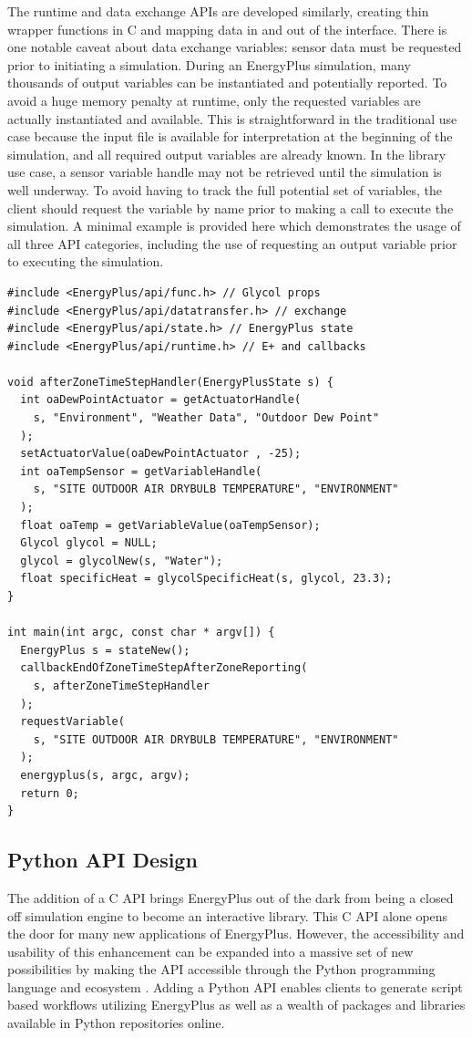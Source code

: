 \documentclass[5p, authoryear]{elsarticle}
\begin{document}
The runtime and data exchange APIs are developed similarly, creating thin wrapper functions in C and mapping data in and out of the interface.  There is one notable caveat about data exchange variables: sensor data must be requested prior to initiating a simulation.  During an EnergyPlus simulation, many thousands of output variables can be instantiated and potentially reported.  To avoid a huge memory penalty at runtime, only the requested variables are actually instantiated and available.  This is straightforward in the traditional use case because the input file is available for interpretation at the beginning of the simulation, and all required output variables are already known.  In the library use case, a sensor variable handle may not be retrieved until the simulation is well underway.  To avoid having to track the full potential set of variables, the client should request the variable by name prior to making a call to execute the simulation.  A minimal example is provided here which demonstrates the usage of all three API categories, including the use of requesting an output variable prior to executing the simulation.  

\lstset{language=c}
\begin{lstlisting}
#include <EnergyPlus/api/func.h> // Glycol props
#include <EnergyPlus/api/datatransfer.h> // exchange 
#include <EnergyPlus/api/state.h> // EnergyPlus state
#include <EnergyPlus/api/runtime.h> // E+ and callbacks

void afterZoneTimeStepHandler(EnergyPlusState s) {
  int oaDewPointActuator = getActuatorHandle(
    s, "Environment", "Weather Data", "Outdoor Dew Point"
  );
  setActuatorValue(oaDewPointActuator , -25);
  int oaTempSensor = getVariableHandle(
    s, "SITE OUTDOOR AIR DRYBULB TEMPERATURE", "ENVIRONMENT"
  );
  float oaTemp = getVariableValue(oaTempSensor);
  Glycol glycol = NULL;
  glycol = glycolNew(s, "Water");
  float specificHeat = glycolSpecificHeat(s, glycol, 23.3);
}

int main(int argc, const char * argv[]) {
  EnergyPlus s = stateNew();
  callbackEndOfZoneTimeStepAfterZoneReporting(
    s, afterZoneTimeStepHandler
  );
  requestVariable(
    s, "SITE OUTDOOR AIR DRYBULB TEMPERATURE", "ENVIRONMENT"
  );
  energyplus(s, argc, argv);
  return 0;
}
\end{lstlisting}

  \subsection{Python API Design}
The addition of a C API brings EnergyPlus out of the dark from being a closed off simulation engine to become an interactive library.  This C API alone opens the door for many new applications of EnergyPlus. However, the accessibility and usability of this enhancement can be expanded into a massive set of new possibilities by making the API accessible through the Python programming language and ecosystem \citep{Rossum}.  Adding a Python API enables clients to generate script based workflows utilizing EnergyPlus as well as a wealth of packages and libraries available in Python repositories online.
\end{document}
